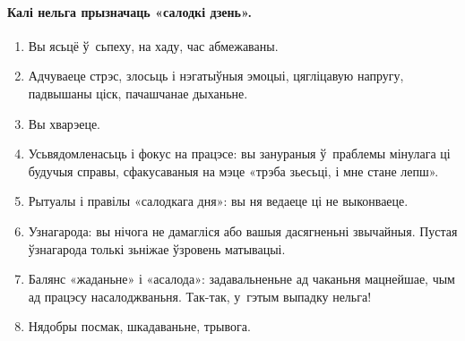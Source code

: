 \paragraph{Калі нельга прызначаць «салодкі дзень».}
\begin{enumerate}
  \item Вы ясьцё ў~сьпеху, на хаду, час абмежаваны.
  \item Адчуваеце стрэс, злосьць і нэгатыўныя эмоцыі, цягліцавую напругу, падвышаны ціск, пачашчанае дыханьне.
  \item Вы хварэеце.
  \item Усьвядомленасьць і фокус на працэсе: вы занураныя ў~праблемы мінулага ці будучыя справы, сфакусаваныя на мэце «трэба зьесьці, і мне стане лепш».
  \item Рытуалы і правілы «салодкага дня»: вы ня ведаеце ці не выконваеце.
  \item Узнагарода: вы нічога не дамагліся або вашыя дасягненьні звычайныя. Пустая ўзнагарода толькі зьніжае ўзровень матывацыі.
  \item Балянс «жаданьне» і «асалода»: задавальненьне ад чаканьня мацнейшае, чым ад працэсу насалоджваньня. Так-так, у~гэтым выпадку нельга!
  \item Нядобры посмак, шкадаваньне, трывога.
\end{enumerate}